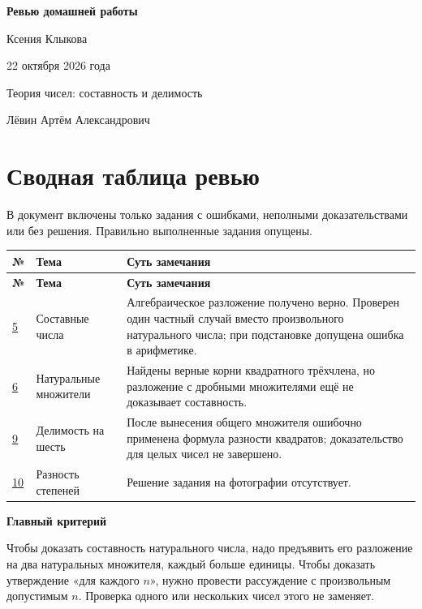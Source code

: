 \documentclass[12pt,a4paper]{article}
\newcommand{\parthead}[1]{\par\medskip\textbf{#1}\par\smallskip}
\begin{document}
\begin{titlepage}
\thispagestyle{empty}
\vspace*{0.28\textheight}
\begin{center}
{\LARGE\bfseries Ревью домашней работы\par}
\vspace{16mm}
{\Large Ксения Клыкова\par}
\vspace{9mm}
{\large 22 октября 2026 года\par}
\vspace{12mm}
{\large Теория чисел: составность и делимость\par}
\end{center}
\vfill
\begin{center}
Лёвин Артём Александрович
\end{center}
\end{titlepage}

\section*{Сводная таблица ревью}
В документ включены только задания с ошибками, неполными доказательствами или без решения. Правильно выполненные задания опущены.

\begin{longtable}{@{}p{1.1cm}p{3.1cm}p{10.6cm}@{}}
\toprule
\textbf{№} & \textbf{Тема} & \textbf{Суть замечания}\\
\midrule
\endfirsthead
\toprule
\textbf{№} & \textbf{Тема} & \textbf{Суть замечания}\\
\midrule
\endhead
\hyperref[task:5]{5} & Составные числа & Алгебраическое разложение получено верно. Проверен один частный случай вместо произвольного натурального числа; при подстановке допущена ошибка в арифметике.\\ \midrule
\hyperref[task:6]{6} & Натуральные множители & Найдены верные корни квадратного трёхчлена, но разложение с дробными множителями ещё не доказывает составность.\\ \midrule
\hyperref[task:9]{9} & Делимость на шесть & После вынесения общего множителя ошибочно применена формула разности квадратов; доказательство для целых чисел не завершено.\\ \midrule
\hyperref[task:10]{10} & Разность степеней & Решение задания на фотографии отсутствует.\\
\bottomrule
\end{longtable}

\parthead{Главный критерий}
Чтобы доказать составность натурального числа, надо предъявить его разложение на два натуральных множителя, каждый больше единицы. Чтобы доказать утверждение «для каждого $n$», нужно провести рассуждение с произвольным допустимым $n$. Проверка одного или нескольких чисел этого не заменяет.
\end{document}
